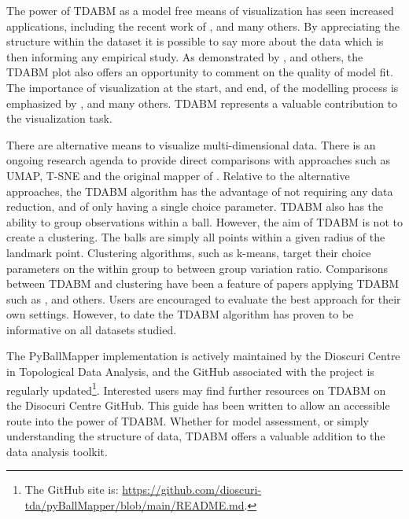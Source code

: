 \documentclass{article}
\begin{document}
The power of TDABM as a model free means of visualization has seen increased applications, including the recent work of \cite{otway2024shape, rudkin2023economic, rudkin2024return, tubadji2025cultural}, and many others. By appreciating the structure within the dataset it is possible to say more about the data which is then informing any empirical study. As demonstrated by \cite{dlotko2021financial}, \cite{rudkin2024return} and others, the TDABM plot also offers an opportunity to comment on the quality of model fit. The importance of visualization at the start, and end, of the modelling process is emphasized by \cite{anscombe1973graphs}, \cite{matejka2017same} and many others. TDABM represents a valuable contribution to the visualization task.

There are alternative means to visualize multi-dimensional data. There is an ongoing research agenda to provide direct comparisons with approaches such as UMAP, T-SNE and the original mapper of \cite{singh2007topological}. Relative to the alternative approaches, the TDABM algorithm has the advantage of not requiring any data reduction, and of only having a single choice parameter. TDABM also has the ability to group observations within a ball. However, the aim of TDABM is not to create a clustering. The balls are simply all points within a given radius of the landmark point. Clustering algorithms, such as k-means, target their choice parameters on the within group to between group variation ratio. Comparisons between TDABM and clustering have been a feature of papers applying TDABM such as \cite{rudkin2023economic}, \cite{otway2024shape} and others. Users are encouraged to evaluate the best approach for their own settings. However, to date the TDABM algorithm has proven to be informative on all datasets studied.

The PyBallMapper implementation is actively maintained by the Dioscuri Centre in Topological Data Analysis, and the GitHub associated with the project is regularly updated\footnote{The GitHub site is: \href{https://github.com/dioscuri-tda/pyBallMapper/blob/main/README.md}{https://github.com/dioscuri-tda/pyBallMapper/blob/main/README.md}.}. Interested users may find further resources on TDABM on the Disocuri Centre GitHub. This guide has been written to allow an accessible route into the power of TDABM. Whether for model assessment, or simply understanding the structure of data, TDABM offers a valuable addition to the data analysis toolkit. 




\end{document}

